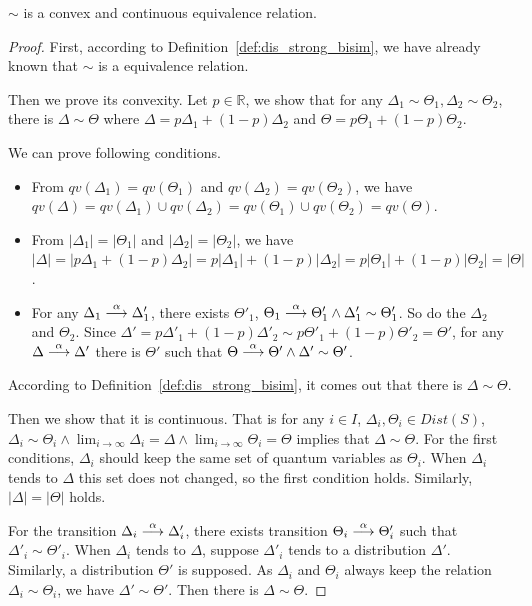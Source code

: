 \documentclass[runningheads]{llncs}
\begin{document}
\begin{lemma}\label{lem:bisim_is_rel}
$\sim$ is a convex and continuous equivalence relation.
\begin{proof}
First, according to Definition~\ref{def:dis_strong_bisim}, we have already known that $\sim$ is a equivalence relation. 

Then we prove its convexity. Let $p\in\mathbb{R}$, we show that for any $\Delta_1\sim\Theta_1,\Delta_2\sim\Theta_2$, there is $\Delta\sim\Theta$ where $\Delta=p\Delta_1+(1-p)\Delta_2$ and $\Theta=p\Theta_1+(1-p)\Theta_2$.

We can prove following conditions.
\begin{itemize}
    \item From $qv(\Delta_1)=qv(\Theta_1)$ and $qv(\Delta_2)=qv(\Theta_2)$, we have $qv(\Delta)=qv(\Delta_1)\cup qv(\Delta_2)=qv(\Theta_1)\cup qv(\Theta_2)=qv(\Theta)$.
    \item From $|\Delta_1|=|\Theta_1|$ and $|\Delta_2|=|\Theta_2|$, we have $|\Delta|=|p\Delta_1+(1-p)\Delta_2|=p|\Delta_1|+(1-p)|\Delta_2|=p|\Theta_1|+(1-p)|\Theta_2|=|\Theta|$.
    \item For any $\Delta_1\mathrel{\stackrel{\alpha}{\longrightarrow}}\Delta'_1$, there exists $\Theta'_1$, $\Theta_1\mathrel{\stackrel{\alpha}{\longrightarrow}}\Theta'_1\wedge\Delta'_1\sim\Theta'_1$. So do the $\Delta_2$ and $\Theta_2$. Since $\Delta'=p\Delta'_1+(1-p)\Delta'_2\sim p\Theta'_1+(1-p)\Theta'_2=\Theta'$, for any $\Delta\mathrel{\stackrel{\alpha}{\longrightarrow}}\Delta'$ there is $\Theta'$ such that $\Theta\mathrel{\stackrel{\alpha}{\longrightarrow}}\Theta'\wedge\Delta'\sim\Theta'$.
\end{itemize}
According to Definition~\ref{def:dis_strong_bisim}, it comes out that there is $\Delta\sim\Theta$.

Then we show that it is continuous. That is for any $i\in I$, $\Delta_{i},\Theta_{i}\in Dist(S)$, $\Delta_{i}\sim\Theta_{i}\wedge\lim_{i\rightarrow\infty}{\Delta_{i}}=\Delta\wedge\lim_{i\rightarrow\infty}{\Theta_{i}}=\Theta$ implies that $\Delta\sim\Theta$. For the first  conditions, $\Delta_{i}$ should keep the same set of quantum variables as $\Theta_{i}$. When $\Delta_{i}$ tends to $\Delta$ this set does not changed, so the first condition holds. Similarly, $|\Delta|=|\Theta|$ holds.

For the transition $\Delta_{i}\mathrel{\stackrel{\alpha}{\longrightarrow}}\Delta'_{i}$, there exists transition $\Theta_{i}\mathrel{\stackrel{\alpha}{\longrightarrow}}\Theta'_{i}$ such that $\Delta'_{i}\sim\Theta'_{i}$. When $\Delta_{i}$ tends to $\Delta$, suppose $\Delta'_{i}$ tends to a distribution $\Delta'$. Similarly, a distribution $\Theta'$ is supposed. As $\Delta_{i}$ and $\Theta_{i}$ always keep the relation $\Delta_{i}\sim\Theta_{i}$, we have $\Delta'\sim\Theta'$. Then there is $\Delta\sim\Theta$.
\end{proof}
\end{lemma}
\end{document}
